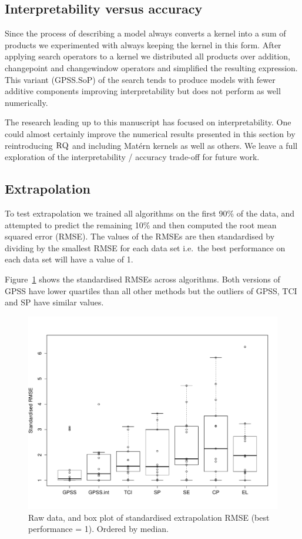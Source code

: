 \documentclass{article}
\def\ie{i.e.\ }
\begin{document}
\subsection{Interpretability versus accuracy}

Since the process of describing a model always converts a kernel into a sum of products we experimented with always keeping the kernel in this form.
After applying search operators to a kernel we distributed all products over addition, changepoint and changewindow operators and simplified the resulting expression.
This variant (GPSS.SoP) of the search tends to produce models with fewer additive components improving interpretability but does not perform as well numerically.

The research leading up to this manuscript has focused on interpretability.
One could almost certainly improve the numerical results presented in this section by reintroducing ${\textsc{RQ}}$ and including Mat\'ern kernels as well as others.
We leave a full exploration of the interpretability / accuracy trade-off for future work.

\subsection{Extrapolation}

To test extrapolation we trained all algorithms on the first 90\% of the data, and attempted to predict the remaining 10\% and then computed the root mean squared error (RMSE).
The values of the RMSEs are then standardised by dividing by the smallest RMSE for each data set \ie the best performance on each data set will have a value of 1.

Figure~\ref{fig:box_extrap_dist} shows the standardised RMSEs across algorithms.
Both versions of GPSS have lower quartiles than all other methods but the outliers of GPSS, TCI and SP have similar values.

\begin{figure}[h]
\centering
\includegraphics[width=\columnwidth]{figures/box_extrap_dist}
\caption{
Raw data, and box plot of standardised extrapolation RMSE (best performance = 1).
Ordered by median.
}
\label{fig:box_extrap_dist}
\end{figure}
\end{document}
